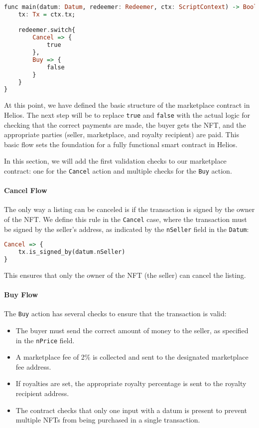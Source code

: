 \begin{lstlisting}[language=haskell, caption=Main Program Logic]
func main(datum: Datum, redeemer: Redeemer, ctx: ScriptContext) -> Bool {
    tx: Tx = ctx.tx;

    redeemer.switch{
        Cancel => {
            true
        },
        Buy => {
            false
        }
    }
}
\end{lstlisting}

At this point, we have defined the basic structure of the marketplace contract in Helios. The next step will be to replace \texttt{true} and \texttt{false} with the actual logic for checking that the correct payments are made, the buyer gets the NFT, and the appropriate parties (seller, marketplace, and royalty recipient) are paid. This basic flow sets the foundation for a fully functional smart contract in Helios.

In this section, we will add the first validation checks to our marketplace contract: one for the \texttt{Cancel} action and multiple checks for the \texttt{Buy} action. 

\paragraph{Cancel Flow}
The only way a listing can be canceled is if the transaction is signed by the owner of the NFT. We define this rule in the \texttt{Cancel} case, where the transaction must be signed by the seller's address, as indicated by the \texttt{nSeller} field in the \texttt{Datum}:

\begin{lstlisting}[language=haskell, caption=Cancel Flow Code]
Cancel => {
    tx.is_signed_by(datum.nSeller)
}
\end{lstlisting}

This ensures that only the owner of the NFT (the seller) can cancel the listing.

\paragraph{Buy Flow}
The \texttt{Buy} action has several checks to ensure that the transaction is valid:

\begin{itemize}
    \item The buyer must send the correct amount of money to the seller, as specified in the \texttt{nPrice} field.
    \item A marketplace fee of 2\% is collected and sent to the designated marketplace fee address.
    \item If royalties are set, the appropriate royalty percentage is sent to the royalty recipient address.
    \item The contract checks that only one input with a datum is present to prevent multiple NFTs from being purchased in a single transaction.
\end{itemize}

